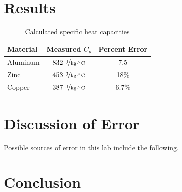 \documentclass{article}
\begin{document}
\section{Results}

\begin{table}[htbp]
\begin{center}
\footnotesize
\begin{tabular}{lcc}
\toprule
 Material  & Measured $C_p$ & Percent Error\\                                                      
\midrule
  
    Aluminum   & $832\   \nicefrac{ \text{J}}{\text{kg}\cdot {}^{\circ}\text{C}}$ &   7.5   \\
    Zinc     & $453\  \nicefrac{ \text{J}}{\text{kg}\cdot {}^{\circ}\text{C}}$  & 18\%   \\
     Copper     & $387\   \nicefrac{ \text{J}}{\text{kg}\cdot {}^{\circ}\text{C}}$   & 6.7\%   \\
    
\bottomrule
\end{tabular}
\end{center}
  \caption{Calculated specific heat capacities}
  \label{tab:font-sizes}
\end{table}


 

\section{Discussion of Error}
Possible sources of error in this lab include the following.

\section{Conclusion}





\end{document}
